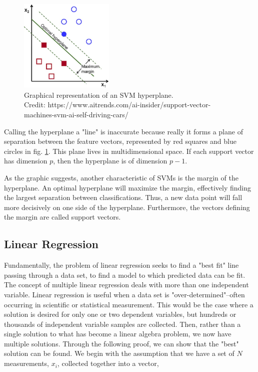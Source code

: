 \documentclass[11pt,a4paper]{article}
\begin{document}
\begin{figure}[ht]
\centering
\includegraphics[width=0.4\textwidth]{svm}
\caption{Graphical representation of an SVM hyperplane. \\Credit: https://www.aitrends.com/ai-insider/support-vector-machines-svm-ai-self-driving-cars/}
\label{fig:svm}
\end{figure}

Calling the hyperplane a "line" is inaccurate because really it forms a plane of separation between the feature vectors, represented by red squares and blue circles in fig. \ref{fig:svm}. This plane lives in multidimensional space. If each support vector has dimension $p$, then the hyperplane is of dimension $p-1$. 

As the graphic suggests, another characteristic of SVMs is the margin of the hyperplane. An optimal hyperplane will maximize the margin, effectively finding the largest separation between classifications. Thus, a new data point will fall more decisively on one side of the hyperplane. Furthermore, the vectors defining the margin are called support vectors.

\subsection{Linear Regression}
Fundamentally, the problem of linear regression seeks to find a "best fit" line passing through a data set, to find a model to which predicted data can be fit. The concept of multiple linear regression deals with more than one independent variable. Linear regression is useful when a data set is "over-determined"--often occurring in scientific or statistical measurement. This would be the case where a solution is desired for only one or two dependent variables, but hundreds or thousands of independent variable samples are collected. Then, rather than a single solution to what has become a linear algebra problem, we now have multiple solutions. Through the following proof, we can show that the "best" solution can be found.
We begin with the assumption that we have a set of $N$ measurements, $x_i$, collected together into a vector,
\end{document}
